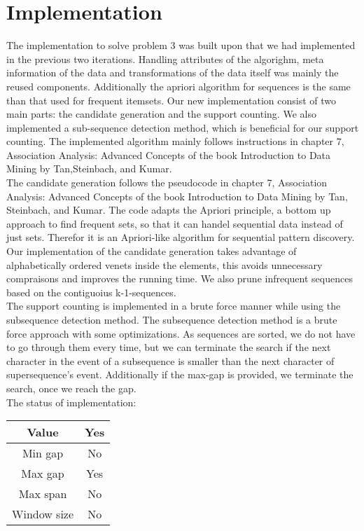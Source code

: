 \section{Implementation}
The implementation to solve problem 3 was built upon that we had implemented in the previous two iterations. Handling attributes of the algorighm, meta information of the data and transformations of the data itself was mainly the reused components. Additionally the apriori algorithm for sequences is the same than that used for frequent itemsets. Our new implementation consist of two main parts: the candidate generation and the support counting. We also implemented a sub-sequence detection method, which is beneficial for our support counting. The implemented algorithm mainly follows instructions in chapter 7, Association Analysis: Advanced Concepts of the book Introduction to Data Mining by Tan,Steinbach, and Kumar.\\ 

The candidate generation follows the pseudocode in chapter 7, Association Analysis: Advanced Concepts of the book Introduction to Data Mining by Tan, Steinbach, and Kumar. The code adapts the Apriori principle, a bottom up approach to find frequent sets, so that it  can handel sequential data instead of just sets. Therefor it is an Apriori-like algorithm for sequential pattern discovery.\\
Our implementation of the candidate generation takes advantage of alphabetically ordered venets inside the elements, this avoids unnecessary compraisons and  improves the running time. We also prune infrequent sequences based on the contiguoius {k-1}-sequences.\\

The support counting is implemented in a brute force manner while using the subsequence detection method. The subsequence detection method is a brute force approach with some optimizations. As sequences are sorted, we do not have to go through them every time, but we can terminate the search if the next character in the event of a subsequence is smaller than the next character of supersequence’s event. Additionally if the max-gap is provided, we terminate the search, once we reach the gap.\\

The status of implementation:\\
\begin{center}
\begin{tabular}{|c|c|}
\hline Value&Yes\\
\hline Min gap&No\\
\hline Max gap&Yes\\
\hline Max span&No\\
\hline Window size&No\\
\hline
\end{tabular}
\end{center}

